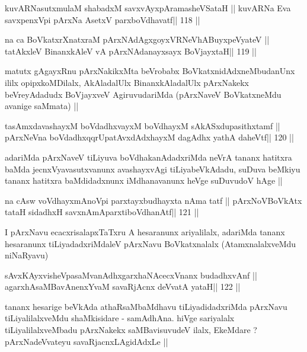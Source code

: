 \begin{shl}
kuvARNasutxmulaM shabadxM savxvAyxpAramasheVSataH ||
kuvARNa Eva savxpenxV\s pi pArxNa AsetxV parxboVdhavatf\hfill || 118 ||
\end{shl}

\begin{shl}
na ca BoVkatxrXnatxraM pArxNAdAgxgoyxVRNeVhABuyxpeVyateV ||
tatAkxleV BinanxkAleV vA pArxNAdanayxsayx BoVjayxtaH\hfill || 119 ||
\end{shl}

\begin{artha}
matutx gAgayxRnu pArxNakikxMta beVrobabx BoVkatxnidAdxneMbudanUnx ililx opipxkoMDilalx, AkAladalUlx BinanxkAladalUlx pArxNakekx beVreyAdadudx BoVjayxveV AgiruvudariMda (pArxNaveV BoVkatxneMdu avanige saMmata) ||
\end{artha}

\begin{shl}
tasAmxdavashayxM boVdadhxvayxM boVdhayxM sAkASxdupasithxtamf ||
pArxNeVna boVdadhxqqrUpatAvxdAdxhayxM dagAdhx yathA daheVtf\hfill || 120 ||
\end{shl}

\begin{artha}
adariMda pArxNaveV tiLiyuva boVdhakanAdadxriMda neVrA tananx hatitxra baMda jecnxVyavasutxvanunx avashayxvAgi tiLiyabeVkAdadu, suDuva beMkiyu tananx hatitxra baMdidadxnunx iMdhanavanunx heVge suDuvudoV hAge ||
\end{artha}

\begin{shl}
na cAsw voVdhayxmAnoV\s pi parxtayxbudhayxta nAma tatf ||
pArxNoV\s BoVkAtx tataH sidadhxH savxnAmAparxtiboVdhanAtf\hfill || 121 ||
\end{shl}

\begin{artha}
I pArxNavu ecacxrisalapxTaTxru A hesaranunx ariyalilalx, adariMda tananx hesaranunx tiLiyadadxriMdaleV pArxNavu BoVkatxnalalx (AtamxnalalxveMdu niNaRyavu)
\end{artha}

\begin{shl}
sAvxKAyxvisheVpasaMvanAdhxgarxhaNAcecxVnanx budadhxvAnf ||
agarxhAsaMBavAnenxYvaM savaRjAcnx deVvatA yataH\hfill || 122 ||
\end{shl}

\begin{artha}
tananx hesarige beVkAda athaRsaMbaMdhavu tiLiyadidadxriMda pArxNavu tiLiyalilalxveMdu shaMkisidare - samAdhAna. hiVge sariyalalx tiLiyalilalxveMbadu pArxNakekx saMBavisuvudeV ilalx, EkeMdare ? pArxNadeVvateyu savaRjacnxLAgidAdxLe ||
\end{artha}

